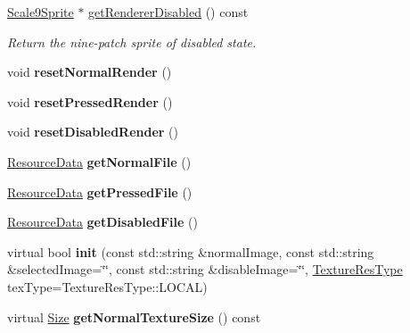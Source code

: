\begin{DoxyCompactItemize}
\hyperlink{classui_1_1Scale9Sprite}{Scale9\+Sprite} $\ast$ \hyperlink{classui_1_1Button_acbc88b0f82871718e0f49bda5e4cf0ca}{get\+Renderer\+Disabled} () const
\begin{DoxyCompactList}\small\item\em Return the nine-\/patch sprite of disabled state. \end{DoxyCompactList}\item 
\mbox{\label{classui_1_1Button_a1dfe05f72236a67c70f39b19afbc8661}} 
void {\bfseries reset\+Normal\+Render} ()
\item 
\mbox{\label{classui_1_1Button_aca5a2f6d3be7e0e97194c7c7674c86ef}} 
void {\bfseries reset\+Pressed\+Render} ()
\item 
\mbox{\label{classui_1_1Button_af0afdaa9bea2207236d4d1edbf47b2eb}} 
void {\bfseries reset\+Disabled\+Render} ()
\item 
\mbox{\label{classui_1_1Button_a0398b8fa1a869e5fbeb892f16a1f5766}} 
\hyperlink{structResourceData}{Resource\+Data} {\bfseries get\+Normal\+File} ()
\item 
\mbox{\label{classui_1_1Button_ab6abacb8e6e9ace596d8b9fb80523352}} 
\hyperlink{structResourceData}{Resource\+Data} {\bfseries get\+Pressed\+File} ()
\item 
\mbox{\label{classui_1_1Button_abd6ae68df17c5a3e27b3cf2881e719b1}} 
\hyperlink{structResourceData}{Resource\+Data} {\bfseries get\+Disabled\+File} ()
\item 
\mbox{\label{classui_1_1Button_a9448f15b3b1fd5d4d1fbb8dab55057e9}} 
virtual bool {\bfseries init} (const std\+::string \&normal\+Image, const std\+::string \&selected\+Image=\char`\"{}\char`\"{}, const std\+::string \&disable\+Image=\char`\"{}\char`\"{}, \hyperlink{classui_1_1Widget_a040a65ec5ad3b11119b7e16b98bd9af0}{Texture\+Res\+Type} tex\+Type=Texture\+Res\+Type\+::\+L\+O\+C\+AL)
\item 
\mbox{\label{classui_1_1Button_ae8773a28ce5722de77b24074af25996b}} 
virtual \hyperlink{classSize}{Size} {\bfseries get\+Normal\+Texture\+Size} () const

\end{DoxyCompactItemize}
